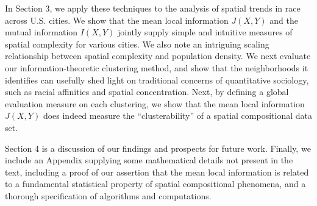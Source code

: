 	In Section 3, we apply these techniques to the analysis of spatial trends in race across U.S. cities. We show that the mean local information $J(X,Y)$ and the mutual information $I(X,Y)$ jointly supply simple and intuitive measures of spatial complexity for various cities. We also note an intriguing scaling relationship between spatial complexity and population density. We next evaluate our information-theoretic clustering method, and show that the neighborhoods it identifies can usefully shed light on traditional concerns of quantitative sociology, such as racial affinities and spatial concentration. Next, by defining a global evaluation measure on each clustering, we show that the mean local information $J(X,Y)$ does indeed measure the ``clusterability'' of a spatial compositional data set. 

	Section 4 is a discussion of our findings and prospects for future work. Finally, we include an Appendix supplying some mathematical details not present in the text, including a proof of our assertion that the mean local information is related to a fundamental statistical property of spatial compositional phenomena, and a thorough specification of algorithms and computations. 
